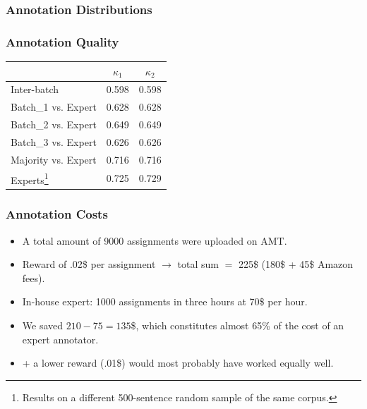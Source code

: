 \documentclass[10pt]{beamer}
\newenvironment{itemwide}%
{\begin{itemize}%
    \setlength{\itemsep}{5pt}%
    \setlength{\parskip}{5pt}}%
  {\end{itemize}}
\begin{document}
\begin{frame}
  \frametitle{Annotation Distributions}
  \begin{center}
  \end{center}
\end{frame}

\begin{frame}
  \frametitle{Annotation Quality}
\begin{center}
\begin{tabular}{|l|c|c|}
\hline
& $\kappa_{1}$ & $\kappa_{2}$ \\ 
\hline
Inter-batch & 0.598 & 0.598 \\ \hline
Batch\_1 vs. Expert & 0.628 & 0.628\\
Batch\_2 vs. Expert & 0.649 & 0.649\\
Batch\_3 vs. Expert & 0.626 & 0.626\\ \hline
Majority vs. Expert & 0.716 & 0.716\\ \hline
Experts\footnote{Results on a different 500-sentence random sample of the same corpus.} & 0.725 & 0.729\\ \hline
\end{tabular}
\end{center}
\end{frame}

\begin{frame}
  \frametitle{Annotation Costs}
\begin{itemwide}
 \item A total amount of 9000 assignments were uploaded on AMT.
 \item Reward of .02\$ per assignment $\rightarrow$ total sum $=$ 225\$ (180\$ + 45\$ Amazon fees).
 \item In-house expert: 1000 assignments in three hours at 70\$ per hour.
 \item We saved $210 - 75 = 135$\$, which constitutes almost 65\% of the cost of an expert annotator.
 \item + a lower reward (.01\$) would most probably have worked equally well.
\end{itemwide}

\end{frame}
\end{document}
